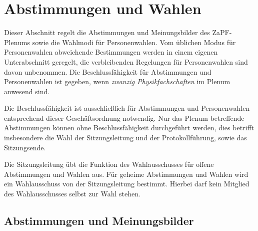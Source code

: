 \documentclass[
  a4paper,
  oneside]{scrartcl}
\begin{document}
\section{Abstimmungen und Wahlen}\label{abstimmungen-und-wahlen}

Dieser Abschnitt regelt die Abstimmungen und Meinungsbilder des
ZaPF-Plenums sowie die Wahlmodi für Personenwahlen. Vom üblichen Modus
für Personenwahlen abweichende Bestimmungen werden in einem eigenen
Unterabschnitt geregelt, die verbleibenden Regelungen für Personenwahlen
sind davon unbenommen. Die Beschlussfähigkeit für Abstimmungen und
Personenwahlen ist gegeben, wenn \emph{zwanzig Physikfachschaften} im
Plenum anwesend sind.

Die Beschlussfähigkeit ist ausschließlich für Abstimmungen und
Personenwahlen entsprechend dieser Geschäftsordnung notwendig. Nur das
Plenum betreffende Abstimmungen können ohne Beschlussfähigkeit
durchgeführt werden, dies betrifft insbesondere die Wahl der
Sitzungsleitung und der Protokollführung, sowie das Sitzungsende.

Die Sitzungsleitung übt die Funktion des Wahlausschusses für offene
Abstimmungen und Wahlen aus. Für geheime Abstimmungen und Wahlen wird
ein Wahlausschuss von der Sitzungsleitung bestimmt. Hierbei darf kein
Mitglied des Wahlausschusses selbst zur Wahl stehen.

\subsection{Abstimmungen und
Meinungsbilder}\label{abstimmungen-und-meinungsbilder}
\end{document}
